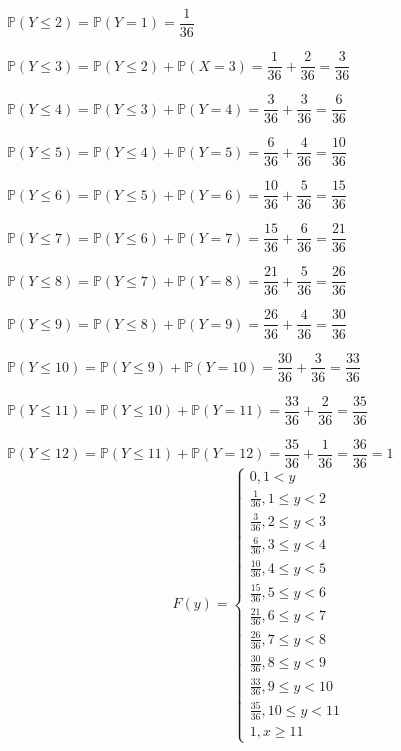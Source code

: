 \documentclass[12pt,a4paper]{article}
\begin{document}
\vspace{1cm}
\begin{center}
	\vspace{0.25cm}
	$\mathbb{P}(Y\leq{2}) = \mathbb{P}(Y=1) = \dfrac{1}{36}$
	
	\vspace{0.5cm}
	$\mathbb{P}(Y\leq3) = \mathbb{P}(Y\leq{2}) + \mathbb{P}(X=3) = \dfrac{1}{36} + \dfrac{2}{36} = \dfrac{3}{36}$
	
	\vspace{0.5cm}
	$\mathbb{P}(Y\leq{4}) = \mathbb{P}(Y\leq3) + \mathbb{P}(Y=4) = \dfrac{3}{36} + \dfrac{3}{36} = \dfrac{6}{36}$
	
	\vspace{0.5cm}
	$\mathbb{P}(Y\leq{5}) = \mathbb{P}(Y\leq{4}) + \mathbb{P}(Y=5) = \dfrac{6}{36} + \dfrac{4}{36} = \dfrac{10}{36}$
	
	\vspace{0.5cm}
	$\mathbb{P}(Y\leq{6}) = \mathbb{P}(Y\leq{5}) + \mathbb{P}(Y=6) = \dfrac{10}{36} + \dfrac{5}{36} = \dfrac{15}{36}$
	
	\vspace{0.5cm}
	$\mathbb{P}(Y\leq{7}) = \mathbb{P}(Y\leq{6}) + \mathbb{P}(Y=7) = \dfrac{15}{36} + \dfrac{6}{36} = \dfrac{21}{36}$
	
		\vspace{0.5cm}
	$\mathbb{P}(Y\leq{8}) = \mathbb{P}(Y\leq{7}) + \mathbb{P}(Y=8) = \dfrac{21}{36} + \dfrac{5}{36} = \dfrac{26}{36}$
	
		\vspace{0.5cm}
	$\mathbb{P}(Y\leq{9}) = \mathbb{P}(Y\leq{8}) + \mathbb{P}(Y=9) = \dfrac{26}{36} + \dfrac{4}{36} = \dfrac{30}{36}$
	
		\vspace{0.5cm}
	$\mathbb{P}(Y\leq{10}) = \mathbb{P}(Y\leq{9}) + \mathbb{P}(Y=10) = \dfrac{30}{36} + \dfrac{3}{36} = \dfrac{33}{36}$
	
		\vspace{0.5cm}
	$\mathbb{P}(Y\leq{11}) = \mathbb{P}(Y\leq{10}) + \mathbb{P}(Y=11) = \dfrac{33}{36} + \dfrac{2}{36} = \dfrac{35}{36}$
	
	\vspace{0.5cm}
	$\mathbb{P}(Y\leq{12}) = \mathbb{P}(Y\leq{11}) + \mathbb{P}(Y=12) = \dfrac{35}{36} + \dfrac{1}{36} = \dfrac{36}{36} = 1$
	\[
	F(y) =
	\begin{cases}
	0, 1 < y \\
	\frac{1}{36}, 1\leq{y} < 2 \\
	\frac{3}{36}, 2\leq{y} < 3\\
	\frac{6}{36}, 3\leq{y} < 4\\
	\frac{10}{36}, 4\leq{y} < 5\\
	\frac{15}{36}, 5\leq{y} < 6\\
	\frac{21}{36}, 6\leq{y} < 7\\
	\frac{26}{36}, 7\leq{y} < 8\\
	\frac{30}{36}, 8\leq{y} < 9\\
	\frac{33}{36}, 9\leq{y} < 10\\
	\frac{35}{36}, 10\leq{y} < 11\\
	1,x\geq{11}
	\end{cases}
	\]
	

\end{center}
\end{document}
